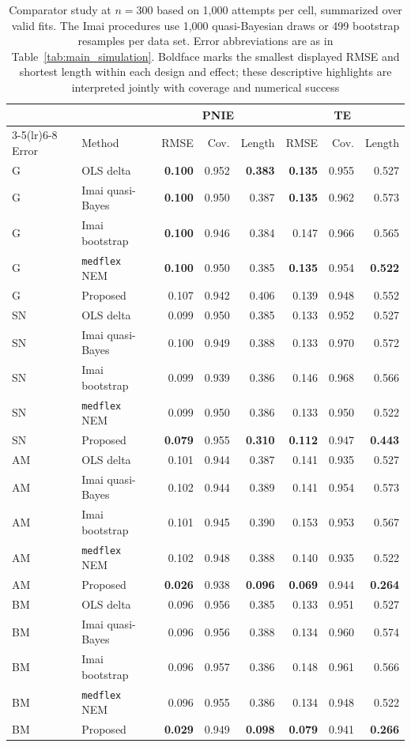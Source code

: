 \begin{table}[t]
\centering
\caption{Comparator study at $n=300$ based on 1,000 attempts per cell, summarized over valid fits. The Imai procedures use 1,000 quasi-Bayesian draws or 499 bootstrap resamples per data set. Error abbreviations are as in Table~\ref{tab:main_simulation}. Boldface marks the smallest displayed RMSE and shortest length within each design and effect; these descriptive highlights are interpreted jointly with coverage and numerical success}
\label{tab:comparators}
\small
\begin{tabular}{llrrrrrr}
\toprule
& & \multicolumn{3}{c}{PNIE} & \multicolumn{3}{c}{TE} \\
\cmidrule(lr){3-5}\cmidrule(lr){6-8}
Error & Method & RMSE & Cov. & Length & RMSE & Cov. & Length \\
\midrule
G & OLS delta & \textbf{0.100} & 0.952 & \textbf{0.383} & \textbf{0.135} & 0.955 & 0.527 \\
G & Imai quasi-Bayes & \textbf{0.100} & 0.950 & 0.387 & \textbf{0.135} & 0.962 & 0.573 \\
G & Imai bootstrap & \textbf{0.100} & 0.946 & 0.384 & 0.147 & 0.966 & 0.565 \\
G & \texttt{medflex} NEM & \textbf{0.100} & 0.950 & 0.385 & \textbf{0.135} & 0.954 & \textbf{0.522} \\
G & Proposed & 0.107 & 0.942 & 0.406 & 0.139 & 0.948 & 0.552 \\
\midrule
SN & OLS delta & 0.099 & 0.950 & 0.385 & 0.133 & 0.952 & 0.527 \\
SN & Imai quasi-Bayes & 0.100 & 0.949 & 0.388 & 0.133 & 0.970 & 0.572 \\
SN & Imai bootstrap & 0.099 & 0.939 & 0.386 & 0.146 & 0.968 & 0.566 \\
SN & \texttt{medflex} NEM & 0.099 & 0.950 & 0.386 & 0.133 & 0.950 & 0.522 \\
SN & Proposed & \textbf{0.079} & 0.955 & \textbf{0.310} & \textbf{0.112} & 0.947 & \textbf{0.443} \\
\midrule
AM & OLS delta & 0.101 & 0.944 & 0.387 & 0.141 & 0.935 & 0.527 \\
AM & Imai quasi-Bayes & 0.102 & 0.944 & 0.389 & 0.141 & 0.954 & 0.573 \\
AM & Imai bootstrap & 0.101 & 0.945 & 0.390 & 0.153 & 0.953 & 0.567 \\
AM & \texttt{medflex} NEM & 0.102 & 0.948 & 0.388 & 0.140 & 0.935 & 0.522 \\
AM & Proposed & \textbf{0.026} & 0.938 & \textbf{0.096} & \textbf{0.069} & 0.944 & \textbf{0.264} \\
\midrule
BM & OLS delta & 0.096 & 0.956 & 0.385 & 0.133 & 0.951 & 0.527 \\
BM & Imai quasi-Bayes & 0.096 & 0.956 & 0.388 & 0.134 & 0.960 & 0.574 \\
BM & Imai bootstrap & 0.096 & 0.957 & 0.386 & 0.148 & 0.961 & 0.566 \\
BM & \texttt{medflex} NEM & 0.096 & 0.955 & 0.386 & 0.134 & 0.948 & 0.522 \\
BM & Proposed & \textbf{0.029} & 0.949 & \textbf{0.098} & \textbf{0.079} & 0.941 & \textbf{0.266} \\
\bottomrule
\end{tabular}
\end{table}
